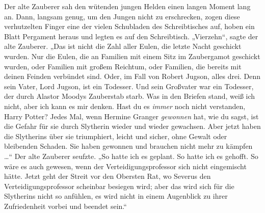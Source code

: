 Der alte Zauberer sah den wütenden jungen Helden einen langen Moment lang an. Dann, langsam genug, um den Jungen nicht zu erschrecken, zogen diese verhutzelten Finger eine der vielen Schubladen des Schreibtisches auf, hoben ein Blatt Pergament heraus und legten es auf den Schreibtisch.
„Vierzehn“, sagte der alte Zauberer.
„Das ist nicht die Zahl aller Eulen, die letzte Nacht geschickt wurden. Nur die Eulen, die an Familien mit einem Sitz im Zaubergamot geschickt wurden, oder Familien mit großem Reichtum, oder Familien, die bereits mit deinen Feinden verbündet sind. Oder, im Fall von Robert Jugson, alles drei. Denn sein Vater, Lord Jugson, ist ein Todesser. Und sein Großvater war ein Todesser, der durch Alastor Moodys Zauberstab starb. Was in den Briefen stand, weiß ich nicht, aber ich kann es mir denken. Hast du es \emph{immer} noch nicht verstanden, Harry Potter? Jedes Mal, wenn Hermine Granger \emph{gewonnen} hat, wie du sagst, ist die Gefahr für sie durch Slytherin wieder und wieder gewachsen. Aber jetzt haben die Slytherins über sie triumphiert, leicht und sicher, ohne Gewalt oder bleibenden Schaden. Sie haben gewonnen und brauchen nicht mehr zu kämpfen …“ Der alte Zauberer seufzte.
„So hatte ich es geplant. So hatte ich es gehofft. So wäre es auch gewesen, wenn der Verteidigungsprofessor sich nicht eingemischt hätte. Jetzt geht der Streit vor den Obersten Rat, wo Severus den Verteidigungsprofessor scheinbar besiegen wird; aber das wird sich für die Slytherins nicht so anfühlen, es wird nicht in einem Augenblick zu ihrer Zufriedenheit vorbei und beendet sein.“

